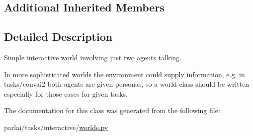 \subsection*{Additional Inherited Members}


\subsection{Detailed Description}
\begin{DoxyVerb}Simple interactive world involving just two agents talking.

In more sophisticated worlds the environment could supply information, e.g. in
tasks/convai2 both agents are given personas, so a world class should be written
especially for those cases for given tasks.
\end{DoxyVerb}
 

The documentation for this class was generated from the following file\+:\begin{DoxyCompactItemize}
\item 
parlai/tasks/interactive/\hyperlink{parlai_2tasks_2interactive_2worlds_8py}{worlds.\+py}\end{DoxyCompactItemize}
